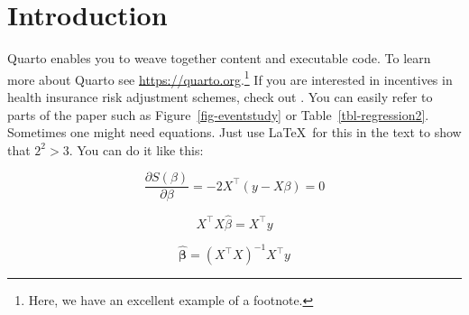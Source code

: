 \documentclass[12pt,a4paper,oneside]{article} %
\begin{document}
\begin{abstract}
	\vspace{-15pt}	
\end{abstract}
\thispagestyle{empty}

\clearpage
\setcounter{page}{1}
\clearpage
\newpage{}

\section{Introduction}\label{introduction}

Quarto enables you to weave together content and executable code. To
learn more about Quarto see \url{https://quarto.org}.\footnote{Here, we
  have an excellent example of a footnote.} If you are interested in
incentives in health insurance risk adjustment schemes, check out
\textcite{reifSettingIncentivesRight2025}. You can easily refer to parts
of the paper such as Figure~\ref{fig-eventstudy} or
Table~\ref{tbl-regression2}. Sometimes one might need equations. Just
use \LaTeX~for this in the text to show that \(2^{2} > 3\). You can do
it like this:

\begin{equation}
\frac{\partial S(\beta)}{\partial \beta} = -2X^\top (y - X\beta) = 0
\end{equation}

\begin{equation}
X^\top X \hat{\beta} = X^\top y
\end{equation}

\begin{equation}
\hat{\bm{\beta}} = (X^\top X)^{-1} X^\top y
\end{equation}
\end{document}

